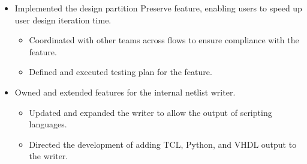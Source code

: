 \documentclass[12pt]{article}
\begin{document}
\begin{small}
\begin{itemize}
            \item {\color{textGray} Implemented the design partition Preserve feature, enabling users to speed up user design iteration time.}
                \begin{itemize}[label=$\circ$,topsep=-5px,partopsep=0px]
                    \itemsep0em 
                    \item {\color{textGray} Coordinated with other teams across flows to ensure compliance with the feature.}
                    \item {\color{textGray} Defined and executed testing plan for the feature.}
                \end{itemize}


            \item {\color{textGray} Owned and extended features for the internal netlist writer.}
                \begin{itemize}[label=$\circ$,topsep=-5px,partopsep=0px]
                    \itemsep0em 
                    \item {\color{textGray} Updated and expanded the writer to allow the output of scripting languages.}
                    \item {\color{textGray} Directed the development of adding TCL, Python, and VHDL output to the writer.}
                \end{itemize}

        \end{itemize}
    \end{small}
\end{document}
